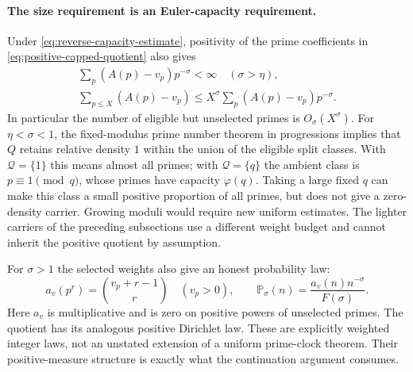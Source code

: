 \documentclass[11pt]{article}
\theoremstyle{definition}
\begin{document}
\paragraph{The size requirement is an Euler-capacity requirement.}
Under \eqref{eq:reverse-capacity-estimate}, positivity of the
prime coefficients in \eqref{eq:positive-capped-quotient} also gives
\begin{equation}
 \begin{gathered}
 \sum_p(A(p)-v_p)p^{-\sigma}<\infty\quad(\sigma>\eta),\\
 \sum_{p\le X}(A(p)-v_p)\le
       X^\sigma\sum_p(A(p)-v_p)p^{-\sigma}.
 \end{gathered}
 \label{eq:capacity-retention-size}
\end{equation}
In particular the number of eligible but unselected primes is
$O_\sigma(X^\sigma)$. For $\eta<\sigma<1$, the fixed-modulus
prime number theorem in progressions implies that $Q$ retains
relative density $1$ within the union of the eligible split
classes. With $\mathcal Q=\{1\}$ this means almost all primes;
with $\mathcal Q=\{q\}$ the ambient class is $p\equiv1\pmod q$,
whose primes have capacity $\varphi(q)$. Taking a large fixed
$q$ can make this class a small positive proportion of all
primes, but does not give a zero-density carrier.
Growing moduli would require new uniform estimates.
The lighter carriers of the preceding subsections use a different
weight budget and cannot inherit the positive quotient by assumption.

For $\sigma>1$ the selected weights also give an honest probability
law:
\[
 a_v(p^r)=\binom{v_p+r-1}{r}\quad(v_p>0),\qquad
 \mathbb P_\sigma(n)=\frac{a_v(n)n^{-\sigma}}{F(\sigma)}.
\]
Here $a_v$ is multiplicative and is zero on positive powers of
unselected primes. The quotient has its analogous positive
Dirichlet law. These are explicitly weighted integer laws, not an
unstated extension of a uniform prime-clock theorem. Their
positive-measure structure is exactly what the continuation
argument consumes.
\end{document}
